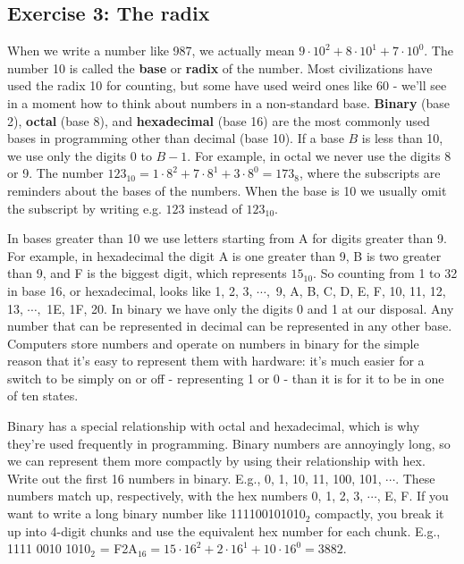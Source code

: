 \documentclass{article}
\begin{document}
\subsection*{Exercise 3: The radix}
When we write a number like 987, we actually mean $9 \cdot 10^{2} + 8 \cdot 10^{1} + 7 \cdot 10^{0}$. The number 10 is called the \textbf{base} or \textbf{radix} of the number. Most civilizations have used the radix 10 for counting, but some have used weird ones like 60 - we'll see in a moment how to think about numbers in a non-standard base. \textbf{Binary} (base 2), \textbf{octal} (base 8), and \textbf{hexadecimal} (base 16) are the most commonly used bases in programming other than decimal (base 10). If a base $B$ is less than 10, we use only the digits 0 to $B - 1$. For example, in octal we never use the digits 8 or 9. The number $123_{10} = 1 \cdot 8^{2} + 7 \cdot 8^{1} + 3 \cdot 8^{0} = 173_{8}$, where the subscripts are reminders about the bases of the numbers. When the base is 10 we usually omit the subscript by writing e.g. $123$ instead of $123_{10}$.

In bases greater than 10 we use letters starting from A for digits greater than 9. For example, in hexadecimal the digit A is one greater than 9, B is two greater than 9, and F is the biggest digit, which represents $15_{10}$. So counting from 1 to 32 in base 16, or hexadecimal, looks like 1, 2, 3, $\cdots,$ 9, A, B, C, D, E, F, 10, 11, 12, 13, $\cdots,$ 1E, 1F, 20. In binary we have only the digits 0 and 1 at our disposal. Any number that can be represented in decimal can be represented in any other base. Computers store numbers and operate on numbers in binary for the simple reason that it's easy to represent them with hardware: it's much easier for a switch to be simply on or off - representing 1 or 0 - than it is for it to be in one of ten states.

Binary has a special relationship with octal and hexadecimal, which is why they're used frequently in programming. Binary numbers are annoyingly long, so we can represent them more compactly by using their relationship with hex. Write out the first 16 numbers in binary. E.g., 0, 1, 10, 11, 100, 101, $\cdots$. These numbers match up, respectively, with the hex numbers 0, 1, 2, 3, $\cdots$, E, F. If you want to write a long binary number like 111100101010$_{2}$ compactly, you break it up into 4-digit chunks and use the equivalent hex number for each chunk. E.g., 1111 0010 1010$_{2}$ = F2A$_{16} = 15 \cdot 16^{2} + 2 \cdot 16^{1} + 10 \cdot 16^{0} = 3882$.
\end{document}
